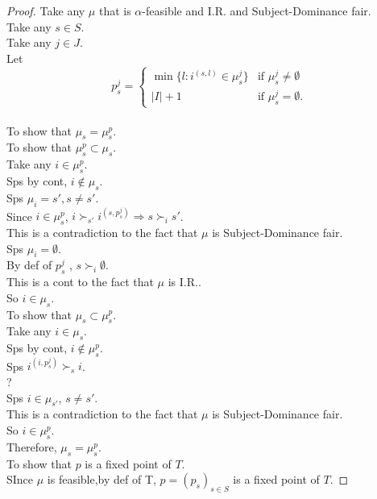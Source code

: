 \documentclass[a4j,10pt]{jsarticle}
\theoremstyle{definition}
\theoremstyle{remark}
\theoremstyle{plain}
\begin{document}
\begin{tcolorbox}[enhanced,breakable=true]
\begin{proof}
  Take any $\mu$ that is $\alpha$-feasible and I.R. and Subject-Dominance fair.\\
  Take any $s \in S$.\\
  Take any $j \in J$.\\
  Let
  \[
  p_s^j =
  \begin{cases}
  \min\{l: i^{(s,l)} \in \mu_s^j \} & \text{if } \mu_s^j \neq \emptyset \\
  |I| + 1   & \text{if } \mu_s^j = \emptyset.
  \end{cases}
  \]\\
  To show that $\mu_s = \mu_s^p$.\\
  To show that $\mu_s^p \subset \mu_s$.\\
  Take any $i \in \mu_s^p$.\\
  Sps by cont, $i \notin \mu_s$.\\
  Sps $\mu_i = s',s \neq s'$.\\
  Since $i \in \mu_s^p$, $i \succ_{s'} i^{(s,p_s^j)} \Rightarrow s \succ_i s'$.\\
  This is a contradiction to the fact that $\mu$ is Subject-Dominance fair.\\
  Sps $\mu_i = \emptyset$.\\
  By def of $p_s^j$ , $s \succ_i \emptyset$.\\
  This is a cont to the fact that $\mu$ is I.R..\\
  So $i \in \mu_s$.\\

  To show that $\mu_s \subset \mu_s^p$.\\
  Take any $i \in \mu_s$.\\
  Sps by cont, $i \notin \mu_s^p$.\\
  Sps $i^{(i,p_s^j)} \succ_s i$.\\
  ?\\
  Sps $i \in \mu_{s'}$, $s \neq s'$.\\
  This is a contradiction to the fact that $\mu$ is Subject-Dominance fair.\\
  So $i \in \mu_s^p$.\\
  Therefore, $\mu_s = \mu_s^p$.\\

  To show that $p$ is a fixed point of $T$.\\
  SInce $\mu$ is feasible,by def of T, $p = (p_s)_{s \in S}$ is a fixed point of $T$.
\end{proof}

\end{tcolorbox}
\bigbreak
\end{document}
